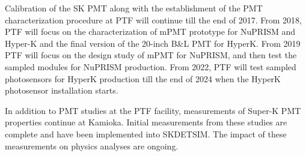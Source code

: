 Calibration of the SK PMT along with the establishment of the PMT characterization procedure
at PTF will continue till the end of 2017. From 2018, PTF will focus on the characterization of
mPMT prototype for NuPRISM and Hyper-K and the final version of the 20-inch B\&L PMT for 
HyperK. From 2019 PTF will focus on the design study of mPMT for NuPRISM, and then test
the sampled modules for NuPRISM production. From 2022, PTF will test sampled 
photosensors for HyperK production till the end of 2024 when the HyperK photosensor installation 
starts.

In addition to PMT studies at the PTF facility, measurements of
Super-K PMT properties continue at Kamioka. Initial measurements from
these studies are complete and have been implemented into
SKDETSIM. The impact of these measurements on physics analyses are
ongoing.



